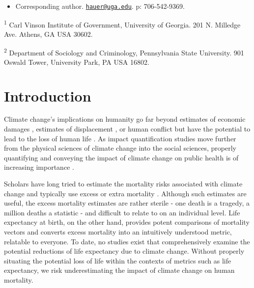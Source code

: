 \documentclass[12pt,]{article}
\providecommand{\tightlist}{%
\setlength{\itemsep}{0pt}\setlength{\parskip}{0pt}}
\begin{document}
\vskip 6.5pt


\noindent \doublespacing \begin{itemize}
\tightlist
\item
  Corresponding author.
  \href{mailto:hauer@uga.edu}{\nolinkurl{hauer@uga.edu}}. p:
  706-542-9369.
\end{itemize}

\textsuperscript{1} Carl Vinson Institute of Government, University of
Georgia. 201 N. Milledge Ave. Athens, GA USA 30602.

\textsuperscript{2} Department of Sociology and Criminology,
Pennsylvania State University. 901 Oswald Tower, University Park, PA USA
16802.

\newpage

\section{Introduction}\label{introduction}

Climate change's implications on humanity go far beyond estimates of
economic damages \citep{hsiang2017estimatin}, estimates of displacement
\citep{nicholls2011sea, hauer2016millions, hauer2017migration}, or human
conflict \citep{barnett2007climate} but have the potential to lead to
the loss of human life
\citep{forzieri2017increasing, pachauri2014climate}. As impact
quantification studies move further from the physical sciences of
climate change into the social sciences, properly quantifying and
conveying the impact of climate change on public health is of increasing
importance \citep{melillo2014climate, cloyd2016engagement}.

Scholars have long tried to estimate the mortality risks associated with
climate change and typically use excess or extra mortality
\citep{forzieri2017increasing, wilson2017climate, mcmichael2006climate, zanobetti2012summer}.
Although such estimates are useful, the excess mortality estimates are
rather sterile - one death is a tragedy, a million deaths a statistic -
and difficult to relate to on an individual level. Life expectancy at
birth, on the other hand, provides potent comparisons of mortality
vectors and converts excess mortality into an intuitively understood
metric, relatable to everyone. To date, no studies exist that
comprehensively examine the potential reductions of life expectancy due
to climate change. Without properly situating the potential loss of life
within the contexts of metrics such as life expectancy, we risk
underestimating the impact of climate change on human mortality.
\end{document}
